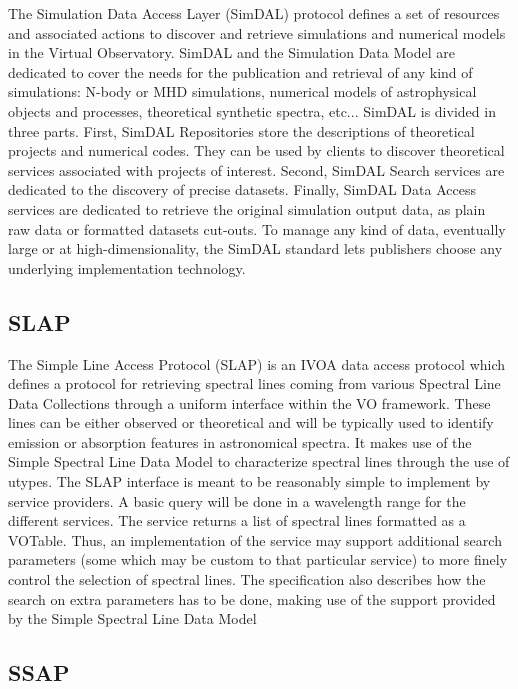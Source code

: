 \documentclass[11pt,letter]{ivoa}
\begin{document}
The Simulation Data Access Layer (SimDAL) \citep{2017ivoa.spec.0320L}
protocol defines a set of resources and associated
actions to discover and retrieve simulations and numerical models in the
Virtual Observatory.
SimDAL and the Simulation Data Model are dedicated to cover the needs
for the publication
and retrieval of any kind of simulations: N-body or MHD simulations,
numerical models of
astrophysical objects and processes, theoretical synthetic spectra,
etc... SimDAL is
divided in three parts. First, SimDAL Repositories store the
descriptions of theoretical
projects and numerical codes. They can be used by clients to discover
theoretical
services associated with projects of interest. Second, SimDAL Search
services are
dedicated to the discovery of precise datasets. Finally, SimDAL Data
Access services
are dedicated to retrieve the original simulation output data, as plain
raw data or
formatted datasets cut-outs. To manage any kind of data, eventually
large or at
high-dimensionality, the SimDAL standard lets publishers choose any
underlying
implementation technology. 

\subsection{SLAP}

The Simple Line Access Protocol (SLAP) \citep{2010ivoa.specQ1209O} is an
IVOA data access protocol which defines a protocol
for retrieving spectral lines coming from various Spectral Line Data
Collections through a
uniform interface within the VO framework. These lines can be either
observed or theoretical
and will be typically used to identify emission or absorption features
in astronomical
spectra. It makes use of the Simple Spectral Line Data Model to
characterize spectral lines
through the use of utypes. The SLAP interface is meant to be reasonably
simple to implement
by service providers. A basic query will be done in a wavelength range
for the different
services. The service returns a list of spectral lines formatted as a
VOTable. Thus, an
implementation of the service may support additional search parameters
(some which may be
custom to that particular service) to more finely control the selection
of spectral lines.
The specification also describes how the search on extra parameters has
to be done, making
use of the support provided by the Simple Spectral Line Data Model

\subsection{SSAP}
\end{document}
